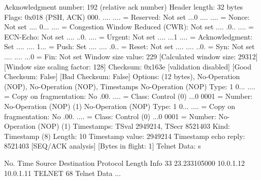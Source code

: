     Acknowledgment number: 192    (relative ack number)
    Header length: 32 bytes
    Flags: 0x018 (PSH, ACK)
        000. .... .... = Reserved: Not set
        ...0 .... .... = Nonce: Not set
        .... 0... .... = Congestion Window Reduced (CWR): Not set
        .... .0.. .... = ECN-Echo: Not set
        .... ..0. .... = Urgent: Not set
        .... ...1 .... = Acknowledgment: Set
        .... .... 1... = Push: Set
        .... .... .0.. = Reset: Not set
        .... .... ..0. = Syn: Not set
        .... .... ...0 = Fin: Not set
    Window size value: 229
    [Calculated window size: 29312]
    [Window size scaling factor: 128]
    Checksum: 0x163e [validation disabled]
        [Good Checksum: False]
        [Bad Checksum: False]
    Options: (12 bytes), No-Operation (NOP), No-Operation (NOP), Timestamps
        No-Operation (NOP)
            Type: 1
                0... .... = Copy on fragmentation: No
                .00. .... = Class: Control (0)
                ...0 0001 = Number: No-Operation (NOP) (1)
        No-Operation (NOP)
            Type: 1
                0... .... = Copy on fragmentation: No
                .00. .... = Class: Control (0)
                ...0 0001 = Number: No-Operation (NOP) (1)
        Timestamps: TSval 2949214, TSecr 8521403
            Kind: Timestamp (8)
            Length: 10
            Timestamp value: 2949214
            Timestamp echo reply: 8521403
    [SEQ/ACK analysis]
        [Bytes in flight: 1]
Telnet
    Data: s

No.     Time           Source                Destination           Protocol Length Info
     33 23.233105000   10.0.1.12             10.0.1.11             TELNET   68     Telnet Data ...

